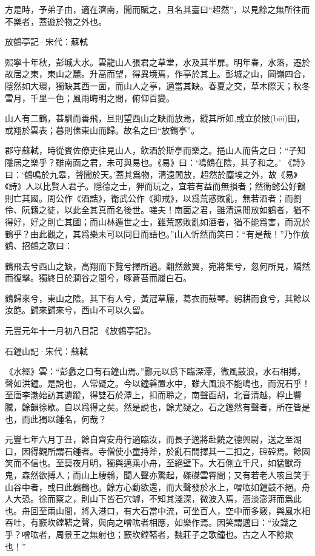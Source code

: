 \documentclass[12pt,a4paper]{ctexbook}
\begin{document}
方是時，予弟子由，適在濟南，聞而賦之，且名其臺曰“超然”，以見餘之無所往而不樂者，蓋遊於物之外也。\par
放鶴亭記·宋代：蘇軾 \par
熙寧十年秋，彭城大水。雲龍山人張君之草堂，水及其半扉。明年春，水落，遷於故居之東，東山之麓。升高而望，得異境焉，作亭於其上。彭城之山，岡嶺四合，隱然如大環，獨缺其西一面，而山人之亭，適當其缺。春夏之交，草木際天；秋冬雪月，千里一色；風雨晦明之間，俯仰百變。\par
山人有二鶴，甚馴而善飛，旦則望西山之缺而放焉，縱其所如,或立於陂(bēi)田，或翔於雲表；暮則傃東山而歸。故名之曰“放鶴亭”。\par
郡守蘇軾，時從賓佐僚吏往見山人，飲酒於斯亭而樂之。挹山人而告之曰：“子知隱居之樂乎？雖南面之君，未可與易也。《易》曰：‘鳴鶴在陰，其子和之。’ 《詩》曰：‘鶴鳴於九皋，聲聞於天。’蓋其爲物，清遠閒放，超然於塵埃之外，故《易》《詩》人以比賢人君子。隱德之士，狎而玩之，宜若有益而無損者；然衛懿公好鶴則亡其國。周公作《酒誥》，衛武公作《抑戒》，以爲荒惑敗亂，無若酒者；而劉伶、阮籍之徒，以此全其真而名後世。嗟夫！南面之君，雖清遠閒放如鶴者，猶不得好，好之則亡其國；而山林遁世之士，雖荒惑敗亂如酒者，猶不能爲害，而況於鶴乎？由此觀之，其爲樂未可以同日而語也。”山人忻然而笑曰：“有是哉！”乃作放鶴、招鶴之歌曰：\par
鶴飛去兮西山之缺，高翔而下覽兮擇所適。翻然斂翼，宛將集兮，忽何所見，矯然而復擊。獨終日於澗谷之間兮，啄蒼苔而履白石。\par
鶴歸來兮，東山之陰。其下有人兮，黃冠草屨，葛衣而鼓琴。躬耕而食兮，其餘以汝飽。歸來歸來兮，西山不可以久留。\par
元豐元年十一月初八日記 《放鶴亭記》。\par
石鐘山記·宋代：蘇軾 \par
《水經》雲：“彭蠡之口有石鐘山焉。”酈元以爲下臨深潭，微風鼓浪，水石相搏，聲如洪鐘。是說也，人常疑之。今以鐘磬置水中，雖大風浪不能鳴也，而況石乎！至唐李渤始訪其遺蹤，得雙石於潭上，扣而聆之，南聲函胡，北音清越，桴止響騰，餘韻徐歇。自以爲得之矣。然是說也，餘尤疑之。石之鏗然有聲者，所在皆是也，而此獨以鍾名，何哉？\par
元豐七年六月丁丑，餘自齊安舟行適臨汝，而長子邁將赴饒之德興尉，送之至湖口，因得觀所謂石鍾者。寺僧使小童持斧，於亂石間擇其一二扣之，硿硿焉。餘固笑而不信也。至莫夜月明，獨與邁乘小舟，至絕壁下。大石側立千尺，如猛獸奇鬼，森然欲搏人；而山上棲鶻，聞人聲亦驚起，磔磔雲霄間；又有若老人咳且笑于山谷中者，或曰此鸛鶴也。餘方心動欲還，而大聲發於水上，噌吰如鐘鼓不絕。舟人大恐。徐而察之，則山下皆石穴罅，不知其淺深，微波入焉，涵淡澎湃而爲此也。舟回至兩山間，將入港口，有大石當中流，可坐百人，空中而多竅，與風水相吞吐，有窾坎鏜鞳之聲，與向之噌吰者相應，如樂作焉。因笑謂邁曰：“汝識之乎？噌吰者，周景王之無射也；窾坎鏜鞳者，魏莊子之歌鐘也。古之人不餘欺也！”\par
\end{document}
